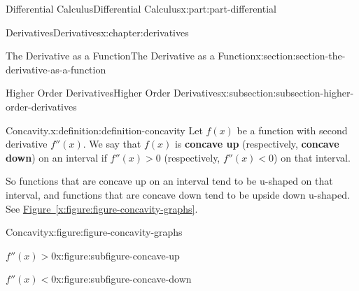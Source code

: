 \documentclass[twoside,10pt,]{book}
\newcommand{\xreffont}{\relax}
\newcommand{\terminology}[1]{\textbf{#1}}
\numberwithin{equation}{part}
\begin{document}
\begin{partptx}{Differential Calculus}{}{Differential Calculus}{}{}{x:part:part-differential}
\begin{chapterptx}{Derivatives}{}{Derivatives}{}{}{x:chapter:derivatives}
\begin{sectionptx}{The Derivative as a Function}{}{The Derivative as a Function}{}{}{x:section:section-the-derivative-as-a-function}
\begin{subsectionptx}{Higher Order Derivatives}{}{Higher Order Derivatives}{}{}{x:subsection:subsection-higher-order-derivatives}
\begin{definition}{Concavity.}{x:definition:definition-concavity}%
Let \(f(x)\) be a function with second derivative \(f''(x)\). We say that \(f(x)\) is \terminology{concave up} (respectively, \terminology{concave down}) on an interval if \(f''(x)>0\) (respectively, \(f''(x) <0\)) on that interval.%
\end{definition}
So functions that are concave up on an interval tend to be u-shaped on that interval, and functions that are concave down tend to be upside down u-shaped. See \hyperref[x:figure:figure-concavity-graphs]{Figure~{\xreffont\ref{x:figure:figure-concavity-graphs}}}.%
\begin{figureptx}{Concavity}{x:figure:figure-concavity-graphs}{}%
\begin{sidebyside}{2}{0}{0}{0}%
\begin{sbspanel}{0.5}%
\begin{subfigureptx}{\(f''(x) > 0\)}{x:figure:subfigure-concave-up}{}%
%
\tcblower
\end{subfigureptx}%
\end{sbspanel}%
\begin{sbspanel}{0.5}%
\begin{subfigureptx}{\(f''(x) < 0\)}{x:figure:subfigure-concave-down}{}%
%
\tcblower
\end{subfigureptx}%

\end{sbspanel}
\end{sidebyside}
\end{figureptx}
\end{subsectionptx}
\end{sectionptx}
\end{chapterptx}
\end{partptx}
\end{document}
